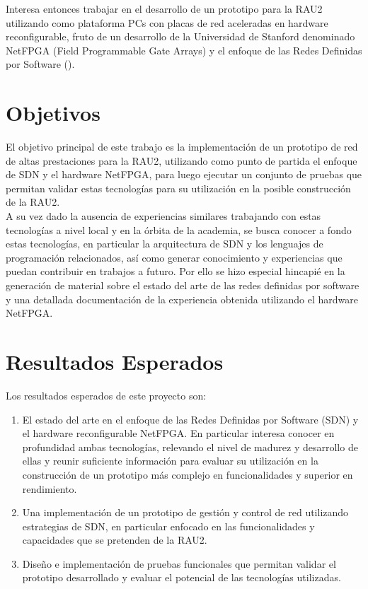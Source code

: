 Interesa entonces trabajar en el desarrollo de un prototipo para la RAU2 utilizando como plataforma PCs con placas de red aceleradas en hardware reconfigurable, fruto de un desarrollo de la Universidad de Stanford denominado NetFPGA (Field Programmable Gate Arrays)\citep{NetFPGA} y el enfoque de las Redes Definidas por Software ()\citep{gude2008nox}\citep{SDNReadingList}.

\section{Objetivos}
El objetivo principal de este trabajo es la implementación de un prototipo de red de altas prestaciones para la RAU2, utilizando como punto de partida el enfoque de SDN y el hardware NetFPGA, para luego ejecutar un conjunto de pruebas que permitan validar estas tecnologías para su utilización en  la posible construcción de la RAU2.\\

A su vez dado la ausencia de experiencias similares trabajando con estas tecnologías a nivel local y en la órbita de la academia, se busca conocer a fondo estas tecnologías, en particular la arquitectura de SDN y los lenguajes de programación relacionados, así como generar conocimiento y experiencias que puedan contribuir en trabajos a futuro. Por ello se hizo especial hincapié en la generación de  material sobre el estado del arte de las redes definidas por software y una detallada documentación de la experiencia obtenida utilizando el hardware NetFPGA.

\section{Resultados Esperados}
Los resultados esperados de este proyecto son:

\begin{enumerate}
\item El estado del arte en el enfoque de las Redes Definidas por Software (SDN) y el hardware reconfigurable NetFPGA. En particular interesa conocer en profundidad ambas tecnologías, relevando el nivel de madurez y desarrollo de ellas y reunir suficiente información para evaluar su utilización en la construcción de un prototipo m\'as complejo en funcionalidades y superior en rendimiento.

\item Una implementaci\'on de un prototipo de gesti\'on y control de red utilizando estrategias de SDN, en particular enfocado en las funcionalidades y capacidades que se pretenden de la RAU2.

\item Diseño e implementación de pruebas funcionales que permitan validar el prototipo desarrollado y evaluar el potencial de las tecnologías utilizadas.

\end{enumerate}

